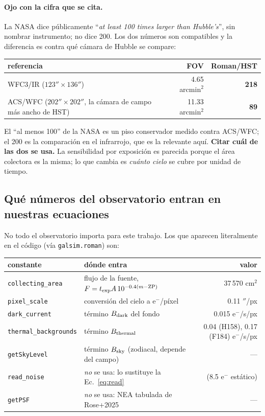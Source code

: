 \documentclass[11pt,a4paper]{article}
\newcommand{\code}[1]{\texttt{\small #1}}
\begin{document}
\paragraph{Ojo con la cifra que se cita.} La NASA dice públicamente ``\emph{at least 100 times larger
than Hubble's}'', sin nombrar instrumento; no dice 200. Los dos números son compatibles y la
diferencia es contra qué cámara de Hubble se compare:
\begin{center}
\begin{tabular}{lrr}
\toprule
referencia & FOV & Roman/HST \\
\midrule
WFC3/IR ($123''\times136''$) & 4.65 arcmin$^2$ & \textbf{218} \\
ACS/WFC ($202''\times202''$, la cámara de campo más ancho de HST) & 11.33 arcmin$^2$ & \textbf{89} \\
\bottomrule
\end{tabular}
\end{center}
El ``al menos 100'' de la NASA es un piso conservador medido contra ACS/WFC; el 200 es la comparación
en el infrarrojo, que es la relevante aquí. \textbf{Citar cuál de las dos se usa.} La sensibilidad
por exposición es parecida porque el área colectora es la misma; lo que cambia es \emph{cuánto cielo}
se cubre por unidad de tiempo.

\subsection{Qué números del observatorio entran en nuestras ecuaciones}
No todo el observatorio importa para este trabajo. Los que aparecen literalmente en el código
(vía \code{galsim.roman}) son:

\begin{center}
\begin{tabular}{llr}
\toprule
constante & dónde entra & valor \\
\midrule
\code{collecting\_area} & flujo de la fuente, $F = t_{\rm exp}A\,10^{-0.4(m-\rm ZP)}$ & 37\,570 cm$^2$ \\
\code{pixel\_scale} & conversión del cielo a e$^-$/píxel & 0.11 $''$/px \\
\code{dark\_current} & término $B_{\rm dark}$ del fondo & 0.015 e$^-$/s/px \\
\code{thermal\_backgrounds} & término $B_{\rm thermal}$ & 0.04 (H158), 0.17 (F184) e$^-$/s/px \\
\code{getSkyLevel} & término $B_{\rm sky}$ (zodiacal, depende del campo) & --- \\
\code{read\_noise} & \emph{no} se usa: lo sustituye la Ec.\ \eqref{eq:read} & (8.5 e$^-$ estático) \\
\code{getPSF} & \emph{no} se usa: NEA tabulada de Rose+2025 & --- \\
\bottomrule
\end{tabular}
\end{center}
\end{document}
